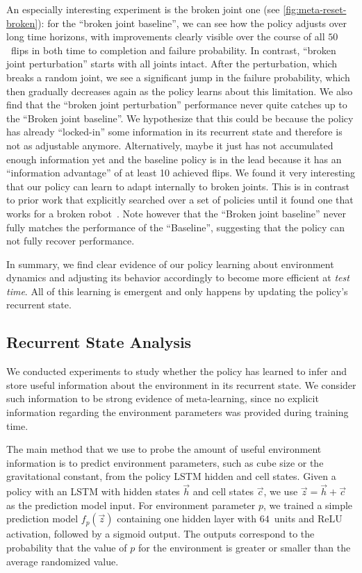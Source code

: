 An especially interesting experiment is the broken joint one (see \autoref{fig:meta-reset-broken}): for the ``broken joint baseline'', we can see how the policy adjusts over long time horizons, with improvements clearly visible over the course of all $50$~flips in both time to completion and failure probability. In contrast, ``broken joint perturbation'' starts with all joints intact. After the perturbation, which breaks a random joint, we see a significant jump in the failure probability, which then gradually decreases again as the policy learns about this limitation. We also find that the ``broken joint perturbation'' performance never quite catches up to the ``Broken joint baseline''. We hypothesize that this could be because the policy has already ``locked-in'' some information in its recurrent state and therefore is not as adjustable anymore. Alternatively, maybe it just has not accumulated enough information yet and the baseline policy is in the lead because it has an ``information advantage'' of at least 10 achieved flips. We found it very interesting that our policy can learn to adapt internally to broken joints. This is in contrast to prior work that explicitly searched over a set of policies until it found one that works for a broken robot~\cite{cully2015robots}. Note however that the ``Broken joint baseline'' never fully matches the performance of the ``Baseline'', suggesting that the policy can not fully recover performance.

In summary, we find clear evidence of our policy learning about environment dynamics and adjusting its behavior accordingly to become more efficient at \emph{test time}. All of this learning is emergent and only happens by updating the policy's recurrent state.

\subsection{Recurrent State Analysis}

We conducted experiments to study whether the policy has learned to infer and store useful information about the environment in its recurrent state. We consider such information to be strong evidence of meta-learning, since no explicit information regarding the environment parameters was provided during training time.

The main method that we use to probe the amount of useful environment information is to predict environment parameters, such as cube size or the gravitational constant, from the policy LSTM hidden and cell states. Given a policy with an LSTM with hidden states $\vec{h}$ and cell states $\vec{c}$, we use $\vec{z} = \vec{h} + \vec{c}$ as the prediction model input. 
For environment parameter $p$, we trained a simple prediction model $f_p(\vec{z})$ containing one hidden layer with $64$~units and ReLU activation, followed by a sigmoid output. The outputs correspond to the probability that the value of $p$ for the environment is greater or smaller than the average randomized value.

